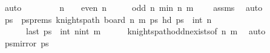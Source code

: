 \begin{isabellebody}
\ auto\isanewline
\ \ \ \ \isanewline
\ \ \isamarkupfalse%
\ {\isachardoublequoteopen}n\ {\isasymge}\ {}{}\ {\isasymand}\ even\ n{\isachardoublequoteclose}\isanewline
\ \ \isamarkupfalse%
\ \isamarkupfalse%
\ {\isachardoublequoteopen}odd\ {\isacharparenleft}{\kern0pt}n{\isacharminus}{\kern0pt}{}{\isacharparenright}{\kern0pt}{\isachardoublequoteclose}\ {\isachardoublequoteopen}min\ {\isacharparenleft}{\kern0pt}n{\isacharminus}{\kern0pt}{}{\isacharparenright}{\kern0pt}\ m\ {\isasymge}\ {}{\isachardoublequoteclose}\ \isamarkupfalse%
\ assms\ \isamarkupfalse%
\ auto\isanewline
\ \ \isamarkupfalse%
\ \isamarkupfalse%
\ ps\ \ psprems{\isacharcolon}{\kern0pt}\ {\isachardoublequoteopen}knights{\isacharunderscore}{\kern0pt}path\ {\isacharparenleft}{\kern0pt}board\ {\isacharparenleft}{\kern0pt}n{\isacharminus}{\kern0pt}{}{\isacharparenright}{\kern0pt}\ m{\isacharparenright}{\kern0pt}\ ps\ {\isachardoublequoteopen}hd\ ps\ {\isacharequal}{\kern0pt}\ {\isacharparenleft}{\kern0pt}int\ {\isacharparenleft}{\kern0pt}n{\isacharminus}{\kern0pt}{}{\isacharparenright}{\kern0pt}{\isacharcomma}{\kern0pt}{}{\isacharparenright}{\kern0pt}{\isachardoublequoteclose}\ \isanewline
\ \ \ \ \ \ {\isachardoublequoteopen}last\ ps\ {\isacharequal}{\kern0pt}\ {\isacharparenleft}{\kern0pt}int\ {\isacharparenleft}{\kern0pt}n{\isacharminus}{\kern0pt}{}{\isacharparenright}{\kern0pt}{\isacharminus}{\kern0pt}{}{\isacharcomma}{\kern0pt}int\ m{\isacharminus}{\kern0pt}{}{\isacharparenright}{\kern0pt}{\isachardoublequoteclose}\isanewline
\ \ \ \ \isamarkupfalse%
\ knights{\isacharunderscore}{\kern0pt}path{\isacharunderscore}{\kern0pt}odd{\isacharunderscore}{\kern0pt}n{\isacharunderscore}{\kern0pt}exists{\isacharbrackleft}{\kern0pt}of\ {\isachardoublequoteopen}n{\isacharminus}{\kern0pt}{}{\isachardoublequoteclose}\ m{\isacharbrackright}{\kern0pt}\ \isamarkupfalse%
\ auto\isanewline
\ \ \isamarkupfalse%
\ {\isacharquery}{\kern0pt}psmirror{}\ ps\isanewline

\end{isabellebody}
